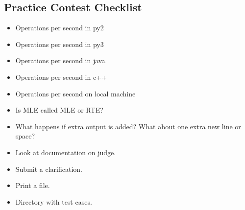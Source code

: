\documentclass[8pt,a4paper,landscape,oneside]{amsart}
\begin{document}
\begin{multicols*}{2}
\begin{large}
\section{Practice Contest Checklist}
\begin{itemize}
    \item Operations per second in py2
    \item Operations per second in py3
    \item Operations per second in java
    \item Operations per second in c++
    \item Operations per second on local machine
    \item Is MLE called MLE or RTE?
    \item What happens if extra output is added? What about one extra new line or space?
    \item Look at documentation on judge.
    \item Submit a clarification.
    \item Print a file.
    \item Directory with test cases.
\end{itemize}


\end{large}
\end{multicols*}
\end{document}
